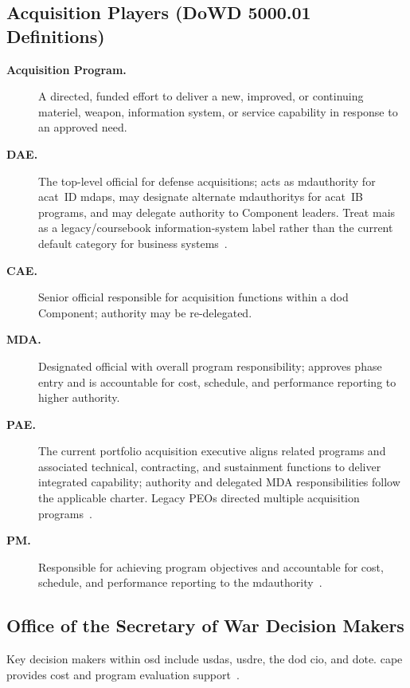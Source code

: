 \documentclass[../main.tex]{subfiles}
\begin{document}
\subsection{Acquisition Players (DoWD 5000.01 Definitions)}
\begin{description}
  \item[\textbf{Acquisition Program.}] A directed, funded effort to deliver a new, improved, or continuing materiel, weapon, information system, or service capability in response to an approved need.
  \item[\textbf{DAE.}] The top-level official for defense acquisitions; acts as \ac{mdauthority} for \ac{acat}~ID \acp{mdap}, may designate alternate \acp{mdauthority} for \ac{acat}~IB programs, and may delegate authority to Component leaders. Treat \ac{mais} as a legacy/coursebook information-system label rather than the current default category for business systems~\autocite{DoDI5000-85,DoDI5000-75,edo-3-3-1-acq-policy-players-2025}.
  \item[\textbf{CAE.}] Senior official responsible for acquisition functions within a \ac{dod} Component; authority may be re-delegated.
  \item[\textbf{MDA.}] Designated official with overall program responsibility; approves phase entry and is accountable for cost, schedule, and performance reporting to higher authority.
  \item[\textbf{PAE.}] The current portfolio acquisition executive aligns related programs and associated technical, contracting, and sustainment functions to deliver integrated capability; authority and delegated MDA responsibilities follow the applicable charter. Legacy PEOs directed multiple acquisition programs~\autocite{edo-3-3-1-acq-policy-players-2025,edo-2-1-2-navsea-organization-2025}.
  \item[\textbf{PM.}] Responsible for achieving program objectives and accountable for cost, schedule, and performance reporting to the \ac{mdauthority}~\autocite{edo-3-3-1-acq-policy-players-2025}.
\end{description}

\subsection{Office of the Secretary of War Decision Makers}
Key decision makers within \ac{osd} include \ac{usdas}, \ac{usdre}, the \ac{dod} \ac{cio}, and \ac{dote}. \ac{cape} provides cost and program evaluation support~\autocite{edo-3-3-1-acq-policy-players-2025}.
\end{document}
